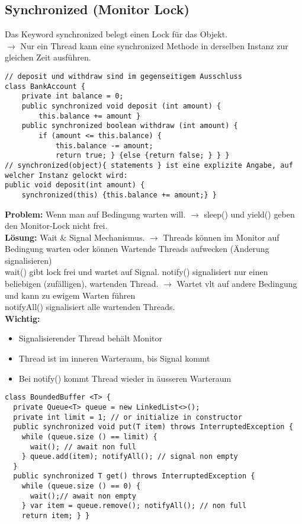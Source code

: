 \subsection{Synchronized (Monitor Lock)}
Das Keyword \textcolor{b}{synchronized} belegt einen Lock für das Objekt.\\
$\rightarrow$ Nur ein Thread kann eine synchronized Methode in derselben Instanz zur gleichen Zeit ausführen.
\begin{lstlisting}
// deposit und withdraw sind im gegenseitigem Ausschluss
class BankAccount {
    private int balance = 0;
    public synchronized void deposit (int amount) {
        this.balance += amount }
    public synchronized boolean withdraw (int amount) {
        if (amount <= this.balance) {
            this.balance -= amount;
            return true; } {else {return false; } } }
// synchronized(object){ statements } ist eine explizite Angabe, auf welcher Instanz gelockt wird:
public void deposit(int amount) {
    synchronized(this) {this.balance += amount;} }
\end{lstlisting}
\textbf{Problem:} Wenn man auf Bedingung warten will. $\rightarrow$ \textcolor{b}{sleep()} und \textcolor{b}{yield()} geben den Monitor-Lock nicht frei.\\
\textbf{Lösung:} Wait \& Signal Mechanismus. $\rightarrow$ Threads können im Monitor auf Bedingung warten oder können Wartende Threads aufwecken (Änderung signalisieren)\\
\textcolor{b}{wait()} gibt lock frei und wartet auf Signal. \textcolor{b}{notify()} signalisiert nur einen beliebigen (zufälligen), wartenden Thread. $\rightarrow$ Wartet vlt auf andere Bedingung und kann zu ewigem Warten führen\\
\textcolor{b}{notifyAll()} signalisiert alle wartenden Threads.\\
\textbf{Wichtig:}
\begin{itemize}[topsep=0pt, leftmargin=3mm]
    \setlength\itemsep{-0.3em}
    \item Signalisierender Thread behält Monitor
    \item Thread ist im inneren Warteraum, bis Signal kommt
    \item Bei notify() kommt Thread wieder in äusseren Warteraum
\end{itemize}
\begin{lstlisting}
class BoundedBuffer <T> {
  private Queue<T> queue = new LinkedList<>();
  private int limit = 1; // or initialize in constructor
  public synchronized void put(T item) throws InterruptedException {
    while (queue.size () == limit) {
      wait(); // await non full
    } queue.add(item); notifyAll(); // signal non empty
  }
  public synchronized T get() throws InterruptedException {
    while (queue.size () == 0) {
      wait();// await non empty
    } var item = queue.remove(); notifyAll(); // non full
    return item; } }
\end{lstlisting}